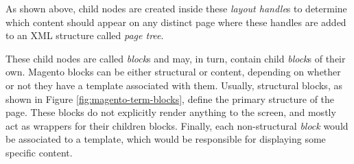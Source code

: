 As shown above, child nodes are created inside these \textit{layout handle}s to determine which content should appear on any distinct page where these handles are added to an XML structure called \textit{page tree}.

These child nodes are called \textit{block}s and may, in turn, contain child \textit{block}s of their own. 
Magento blocks can be either structural or content, depending on whether or not they have a template associated with them.
Usually, structural blocks, as shown in Figure \ref{fig:magento-term-blocks}, define the primary structure of the page. These blocks do not explicitly render anything to the screen, and mostly act as wrappers for their children blocks.
Finally, each non-structural \textit{block} would be associated to a template, which would be responsible for displaying some specific content.

